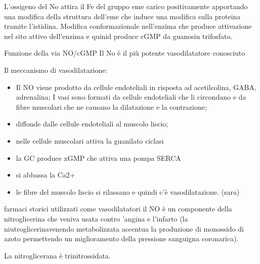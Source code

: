 \documentclass[]{article}
\begin{document}
L'ossigeno del No attira il Fe del gruppo eme carico positivamente
apportando una modifica della struttura dell'eme che induce una modifica
sulla proteina tramite l'istidina. Modifica conformazionale nell'enzima
che produce attivazione nel sito attivo dell'enzima e quinid produce
cGMP da guanosin trifosfato.

Funzione della via NO/cGMP Il No è il più potente vasodilatatore
conosciuto

Il meccanismo di vasodilatazione:

\begin{itemize}
\itemsep1pt\parskip0pt
\item
  Il NO viene prodotto da cellule endoteliali in risposta ad
  acetilcolina, GABA, adrenalina; I vasi sono formati da cellule
  endoteliali che li circondano e da fibre muscolari che ne causano la
  dilatazione e la contrazione;
\item
  diffonde dalle cellule endoteliali al muscolo liscio;
\item
  nelle cellule muscolari attiva la guanilato ciclasi
\item
  la GC produce xGMP che attiva una pompa SERCA
\item
  si abbassa la Ca2+
\item
  le fibre del muscolo liscio si rilassano e quindi c'è vasodilatazione.
  (sara)
\end{itemize}

farmaci storici utilizzati come vasodilatatori il NO è un componente
della nitroglicerina che veniva usata contro 'angina e l'infarto (la
niutroglicerinavenendo metabolizzata accentua la produzione di monossido
di azoto permettendo un miglioramento della pressione sanguigna
coronarica).

La nitroglicerana è trinitrossidata.
\end{document}
